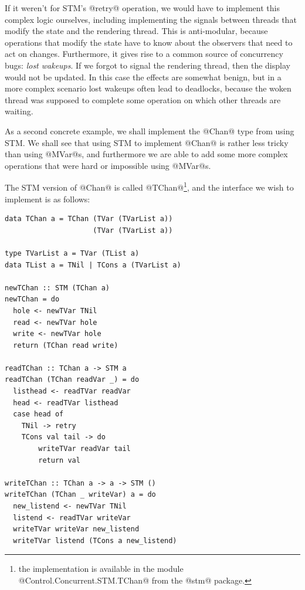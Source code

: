 If it weren't for STM's @retry@ operation, we would have to implement
this complex logic ourselves, including implementing the signals
between threads that modify the state and the rendering thread.  This
is anti-modular, because operations that modify the state have to know
about the observers that need to act on changes.  Furthermore, it
gives rise to a common source of concurrency bugs: \emph{lost
  wakeups}.  If we forgot to signal the rendering thread, then the
display would not be updated.  In this case the effects are somewhat
benign, but in a more complex scenario lost wakeups often lead to
deadlocks, because the woken thread was supposed to complete some
operation on which other threads are waiting.


As a second concrete example, we shall implement the @Chan@ type from
 using STM.  We shall see that using STM to implement
@Chan@ is rather less tricky than using @MVar@s, and furthermore we
are able to add some more complex operations that were hard or
impossible using @MVar@s.

The STM version of @Chan@ is called @TChan@\footnote{the implementation
  is available in the module @Control.Concurrent.STM.TChan@ from the
  @stm@ package.}, and the interface we wish to implement is as
follows:

\begin{lstlisting}[float,label=lst:tchan,caption=implementation of \texttt{TChan},language=HaskellUlisses,style=numbers]
data TChan a = TChan (TVar (TVarList a))
                     (TVar (TVarList a))

type TVarList a = TVar (TList a)
data TList a = TNil | TCons a (TVarList a)

newTChan :: STM (TChan a)
newTChan = do
  hole <- newTVar TNil
  read <- newTVar hole
  write <- newTVar hole
  return (TChan read write)

readTChan :: TChan a -> STM a
readTChan (TChan readVar _) = do
  listhead <- readTVar readVar
  head <- readTVar listhead
  case head of
    TNil -> retry
    TCons val tail -> do
        writeTVar readVar tail
        return val

writeTChan :: TChan a -> a -> STM ()
writeTChan (TChan _ writeVar) a = do
  new_listend <- newTVar TNil
  listend <- readTVar writeVar
  writeTVar writeVar new_listend
  writeTVar listend (TCons a new_listend)
\end{lstlisting}

